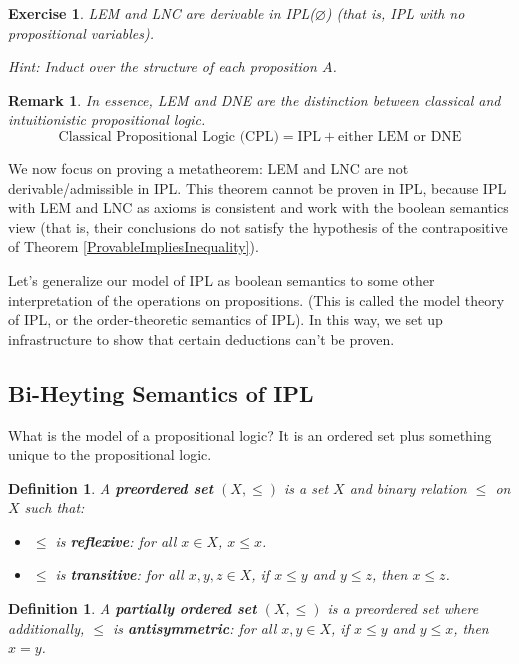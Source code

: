 \documentclass[12pt]{article}
\newtheorem{definition}[theorem]{Definition}
\newtheorem{remark}[theorem]{Remark}
\newtheorem{exercise}[theorem]{Exercise}
\begin{document}
\begin{exercise}
LEM and LNC are derivable in IPL($\varnothing$) (that is, IPL with no propositional variables).

Hint: Induct over the structure of each proposition $A$.
\end{exercise}

\begin{remark}
In essence, LEM and DNE are the distinction between classical and intuitionistic propositional logic.
\[
\text{Classical Propositional Logic (CPL)} = \text{IPL} + \text{either LEM or DNE}
\]
\end{remark}

We now focus on proving a metatheorem: LEM and LNC are not derivable/admissible in IPL. This theorem cannot be proven in IPL, because IPL with LEM and LNC as axioms is consistent and work with the boolean semantics view (that is, their conclusions do not satisfy the hypothesis of the contrapositive of Theorem \ref{ProvableImpliesInequality}).

Let's generalize our model of IPL as boolean semantics to some other interpretation of the operations on propositions. (This is called the model theory of IPL, or the order-theoretic semantics of IPL). In this way, we set up infrastructure to show that certain deductions can't be proven.

\subsection{Bi-Heyting Semantics of IPL}
What is the model of a propositional logic? It is an ordered set plus something unique to the propositional logic.

\begin{definition}
A \textbf{preordered set} $(X, \leq)$ is a set $X$ and binary relation $\leq$ on $X$ such that:
\begin{itemize}
    \item $\leq$ is \textbf{reflexive}: for all $x \in X$, $x \leq x$.
    \item $\leq$ is \textbf{transitive}: for all $x, y, z \in X$, if $x \leq y$ and $y \leq z$, then $x \leq z$.
\end{itemize}
\end{definition}

\begin{definition}
A \textbf{partially ordered set} $(X, \leq)$ is a preordered set where additionally, $\leq$ is \textbf{antisymmetric}: for all $x, y \in X$, if $x \leq y$ and $y \leq x$, then $x = y$.
\end{definition}
\end{document}
